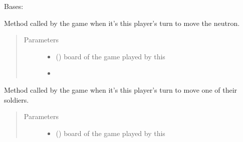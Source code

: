 \documentclass[letterpaper,10pt,english]{sphinxmanual}
\begin{document}
\begin{fulllineitems}
\label{\detokenize{player:player.HumanPlayer}}
Bases: {\hyperref[\detokenize{player:player.Player}]{}}

\begin{fulllineitems}
\label{\detokenize{player:player.HumanPlayer.move_neutron}}
Method called by the game when it’s this player’s turn to move the
neutron.
\begin{quote}\begin{description}
\item[{Parameters}] \leavevmode\begin{itemize}
\item {} 
 ({\hyperref[\detokenize{neutron:neutron.NeutronBoard}]{}}) \textendash{} board of the game played by this

\item {} 
 \textendash{} 

\end{itemize}

\end{description}\end{quote}

\end{fulllineitems}


\begin{fulllineitems}
\label{\detokenize{player:player.HumanPlayer.move_soldier}}
Method called by the game when it’s this player’s turn to move one of
their soldiers.
\begin{quote}\begin{description}
\item[{Parameters}] \leavevmode\begin{itemize}
\item {} 
 ({\hyperref[\detokenize{neutron:neutron.NeutronBoard}]{}}) \textendash{} board of the game played by this


\end{itemize}
\end{description}
\end{quote}
\end{fulllineitems}
\end{fulllineitems}
\end{document}
